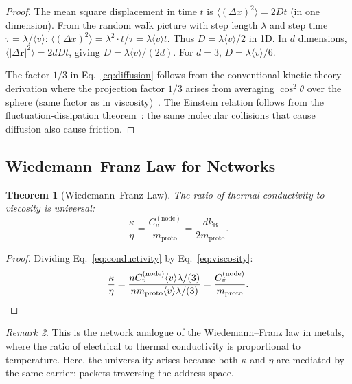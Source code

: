 \documentclass[11pt,twocolumn,a4paper]{article}
\newtheorem{theorem}{Theorem}[section]
\theoremstyle{definition}
\theoremstyle{remark}
\newtheorem{remark}[theorem]{Remark}
\newcommand{\kB}{k_{\mathrm{B}}}
\newcommand{\mpr}{m_{\mathrm{proto}}}
\newcommand{\avg}[1]{\langle #1 \rangle}
\begin{document}
\begin{proof}
The mean square displacement in time $t$ is
$\avg{(\Delta x)^2}=2Dt$ (in one dimension).  From the random walk picture
with step length $\lambda$ and step time $\tau=\lambda/\avg{v}$:
$\avg{(\Delta x)^2}=\lambda^2\cdot t/\tau=\lambda\avg{v}t$.  Thus
$D=\lambda\avg{v}/2$ in 1D.  In $d$ dimensions,
$\avg{|\Delta\bm{r}|^2}=2dDt$, giving $D=\lambda\avg{v}/(2d)$.  For $d=3$,
$D=\lambda\avg{v}/6$.

The factor $1/3$ in Eq.~\eqref{eq:diffusion} follows from the conventional
kinetic theory derivation where the projection factor $1/3$ arises from
averaging $\cos^2\theta$ over the sphere (same factor as in
viscosity)~\cite{Reif1965}.  The Einstein relation follows from the
fluctuation-dissipation theorem~\cite{Kubo1957}: the same molecular collisions
that cause diffusion also cause friction.
\end{proof}

\subsection{Wiedemann--Franz Law for Networks}\label{sec:wf}

\begin{theorem}[Wiedemann--Franz Law]\label{thm:wf}
The ratio of thermal conductivity to viscosity is universal:
\begin{equation}\label{eq:wf}
  \frac{\kappa}{\eta} = \frac{C_v^{(\mathrm{node})}}{\mpr}
  = \frac{d\kB}{2\mpr}.
\end{equation}
\end{theorem}

\begin{proof}
Dividing Eq.~\eqref{eq:conductivity} by Eq.~\eqref{eq:viscosity}:
\[
  \frac{\kappa}{\eta}
  = \frac{nC_v^{(\mathrm{node})}\avg{v}\lambda/(3)}
  {n\mpr\avg{v}\lambda/(3)}
  = \frac{C_v^{(\mathrm{node})}}{\mpr}.\qedhere
\]
\end{proof}

\begin{remark}
This is the network analogue of the Wiedemann--Franz law in metals, where
the ratio of electrical to thermal conductivity is proportional to
temperature.  Here, the universality arises because both $\kappa$ and
$\eta$ are mediated by the same carrier: packets traversing the address
space.
\end{remark}

\end{document}
